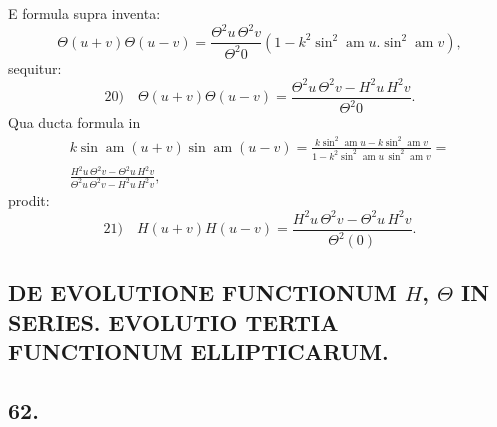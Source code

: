 \documentclass{article}
\begin{document}
E formula supra inventa:
\[
\Theta(u+v)\Theta(u-v)=\frac{\Theta^{2}u\,\Theta^{2}v}{\Theta^{2}0}\left(1-k^{2}\sin^{2}\operatorname{am}u.\sin^{2}\operatorname{am}v\right),
\]
sequitur:
\[
\text{20)}\quad\Theta(u+v)\Theta(u-v)=\frac{\Theta^{2}u\,\Theta^{2}v-H^{2}u\,H^{2}v}{\Theta^{2}0}.
\]
Qua ducta formula in
\[
\begin{gathered}
k\sin\operatorname{am}(u+v)\sin\operatorname{am}(u-v)=\frac{k\sin^{2}\operatorname{am}u-k\sin^{2}\operatorname{am}v}{1-k^{2}\sin^{2}\operatorname{am}u\,\sin^{2}\operatorname{am}v}=\\[1.5ex]
\frac{H^{2}u\,\Theta^{2}v-\Theta^{2}u\,H^{2}v}{\Theta^{2}u\,\Theta^{2}v-H^{2}u\,H^{2}v},
\end{gathered}
\]
prodit:
\[
\text{21)}\quad H(u+v)H(u-v)=\frac{H^{2}u\,\Theta^{2}v-\Theta^{2}u\,H^{2}v}{\Theta^{2}(0)}.
\]

\subsection*{DE EVOLUTIONE FUNCTIONUM $H$, $\Theta$ IN SERIES. EVOLUTIO TERTIA FUNCTIONUM ELLIPTICARUM.}

\subsection*{62.}
\end{document}

